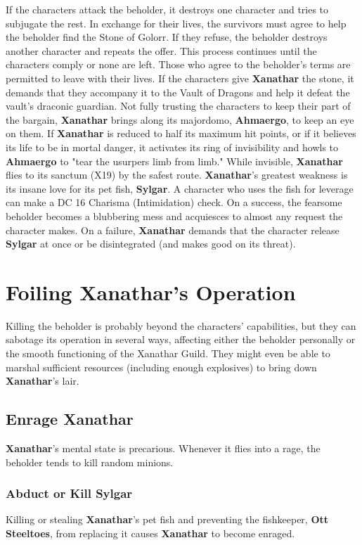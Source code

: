 \documentclass[10pt,a4paper,twoside,twocolumn,openany,nodeprecatedcode]{dndbook}
\begin{document}
If the characters attack the beholder, it destroys one character and tries to subjugate the rest. In exchange for their lives, the survivors must agree to help the beholder find the Stone of Golorr. If they refuse, the beholder destroys another character and repeats the offer. This process continues until the characters comply or none are left. Those who agree to the beholder's terms are permitted to leave with their lives.
If the characters give \textbf{Xanathar} the stone, it demands that they accompany it to the Vault of Dragons and help it defeat the vault's draconic guardian. Not fully trusting the characters to keep their part of the bargain, \textbf{Xanathar} brings along its majordomo, \textbf{Ahmaergo}, to keep an eye on them.
If \textbf{Xanathar} is reduced to half its maximum hit points, or if it believes its life to be in mortal danger, it activates its ring of invisibility and howls to \textbf{Ahmaergo} to "tear the usurpers limb from limb." While invisible, \textbf{Xanathar} flies to its sanctum (X19) by the safest route.
\textbf{Xanathar}'s greatest weakness is its insane love for its pet fish, \textbf{Sylgar}. A character who uses the fish for leverage can make a DC 16 Charisma (Intimidation) check. On a success, the fearsome beholder becomes a blubbering mess and acquiesces to almost any request the character makes. On a failure, \textbf{Xanathar} demands that the character release \textbf{Sylgar} at once or be disintegrated (and makes good on its threat).
\section{Foiling Xanathar's Operation}
Killing the beholder is probably beyond the characters' capabilities, but they can sabotage its operation in several ways, affecting either the beholder personally or the smooth functioning of the Xanathar Guild. They might even be able to marshal sufficient resources (including enough explosives) to bring down \textbf{Xanathar}'s lair.
\subsection{Enrage Xanathar}
\textbf{Xanathar}'s mental state is precarious. Whenever it flies into a rage, the beholder tends to kill random minions.
\subsubsection{Abduct or Kill Sylgar}
Killing or stealing \textbf{Xanathar}'s pet fish and preventing the fishkeeper, \textbf{Ott Steeltoes}, from replacing it causes \textbf{Xanathar} to become enraged.
\end{document}
